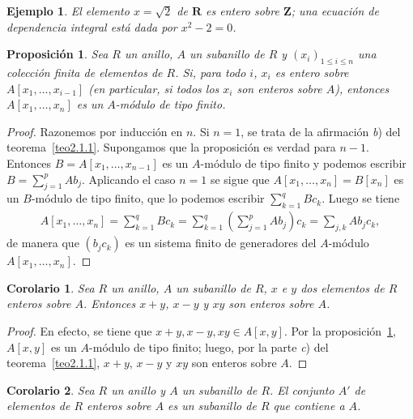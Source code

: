 \documentclass[oneside,bibtotoc,leqno,spanish]{amsbook}
\newcommand{\RR}{\mathbf{R}}
\newcommand{\ZZ}{\mathbf{Z}}
\numberwithin{equation}{section}
\theoremstyle{defi}
\theoremstyle{note}
\newtheorem{proposition}{Proposici\'on}
\newtheorem{corollary}{Corolario}
\theoremstyle{rem}
\newtheorem*{example*}{Ejemplo}
\numberwithin{theorem}{section}
\numberwithin{proposition}{section}
\numberwithin{definition}{section}
\numberwithin{lemma}{section}
\numberwithin{corollary}{section}
\numberwithin{example}{section}
\numberwithin{footnote}{section}%
\begin{document}
\begin{example*}
El elemento $x = \sqrt{2}$ de $\RR$ es entero sobre $\ZZ$; una ecuaci\'on de dependencia
integral est\'a dada por $x^{2}-2 = 0$.
\end{example*}

\begin{proposition}\label{prop2.1.1}
Sea $R$ un anillo, $A$ un subanillo de $R$ y $(x_{i})_{1\leq i\leq n}$ una colecci\'on finita de elementos
de $R$. Si, para todo $i$, $x_{i}$ es entero sobre $A[x_{1},\dots,x_{i-1}]$ (en particular, si todos los
$x_{i}$ son enteros sobre $A$), entonces $A[x_{1},\dots,x_{n}]$ es un $A$-m\'odulo de tipo finito.
\end{proposition}

\begin{proof}
Razonemos por inducci\'on en $n$. Si $n=1$, se trata de la afirmaci\'on {\itshape b}) del teorema~\ref{teo2.1.1}. Supongamos que la
proposici\'on es verdad para $n-1$. Entonces $B = A[x_{1},\dots,x_{n-1}]$ es un $A$-m\'odulo de tipo finito
y podemos escribir $B = \sum_{j=1}^{p}Ab_{j}$. Aplicando el caso $n=1$ se sigue que $A[x_{1},\dots,x_{n}]
=B[x_{n}]$ es un $B$-m\'odulo de tipo finito, que lo podemos escribir $\sum_{k=1}^{q}Bc_{k}$. Luego se tiene
\begin{gather*}
A[x_{1},\dots,x_{n}] = \sum_{k=1}^{q}Bc_{k} = \sum_{k=1}^{q}\left(\sum_{j=1}^{p}Ab_{j}\right)c_{k} = \sum_{j,k}
Ab_{j}c_{k},
\end{gather*}
de manera que $(b_{j}c_{k})$ es un sistema finito de generadores del $A$-m\'odulo $A[x_{1},\dots,x_{n}]$.
\end{proof}

\begin{corollary}\label{cor2.1.1}
Sea $R$ un anillo, $A$ un subanillo de $R$, $x$ e $y$ dos elementos de $R$ enteros sobre $A$. Entonces
$x+y$, $x-y$ y $xy$ son enteros sobre $A$.
\end{corollary}

\begin{proof}
En efecto, se tiene que $x+y, x-y, xy\in A[x,y]$. Por la proposici\'on~\ref{prop2.1.1},
$A[x,y]$ es un $A$-m\'odulo
de tipo finito; luego, por la parte {\itshape c}) del teorema~\ref{teo2.1.1},
$x+y$, $x-y$ y $xy$ son enteros sobre $A$.
\end{proof}

\begin{corollary}\label{cor2.1.2}
Sea $R$ un anillo y $A$ un subanillo de $R$. El conjunto $A'$ de elementos de $R$ enteros sobre $A$
es un subanillo de $R$ que contiene a $A$.
\end{corollary}
\end{document}

